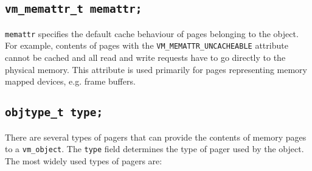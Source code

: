 \documentclass[shortabstract, english]{iithesis}
\begin{document}
\subsection*{\texttt{vm_memattr_t memattr;}}

\texttt{memattr} specifies the default cache behaviour \cite[Section~11.3]{bib:intel} of pages belonging
to the object. For example, contents of pages with the
\texttt{VM_MEMATTR_UNCACHEABLE} attribute cannot be cached and all read
and write requests have to go directly to the physical memory. This attribute is
used primarily for pages representing memory mapped devices, e.g. frame buffers.

\subsection*{\texttt{objtype_t type;}}

There are several types of pagers that can provide the contents of memory pages
to a \texttt{vm_object}. The \texttt{type} field determines the
type of pager used by the object. The most widely used types of pagers are:
\end{document}
